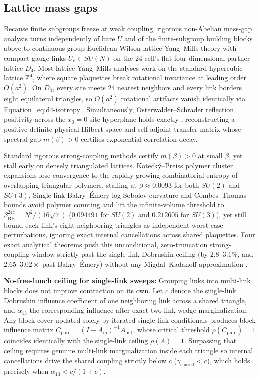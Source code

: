\subsection{Lattice mass gaps}

Because finite subgroups freeze at weak coupling, rigorous non-Abelian mass-gap analysis turns independently of bare $U$
and of the finite-subgroup building blocks above to continuous-group Euclidean Wilson lattice Yang--Mills theory
\cite{wilson1974} with compact gauge links $U_e \in SU(N)$ on the 24-cell's flat four-dimensional partner lattice $D_4$.
Most lattice Yang--Mills analyses work on the standard hypercubic lattice $\mathbb{Z}^4$, where square plaquettes break
rotational invariance at leading order $O(a^2)$. On $D_4$, every site meets 24 nearest neighbors and every link borders
eight equilateral triangles, so $O(a^2)$ rotational artifacts vanish identically via Equation~\eqref{eq:d4-isotropy}.
Simultaneously, Osterwalder--Schrader reflection positivity across the $x_0 = 0$ site hyperplane holds exactly
\cite{celmaster1982, osterwalder1978, seiler1982}, reconstructing a positive-definite physical Hilbert space and
self-adjoint transfer matrix whose spectral gap $m(\beta) > 0$ certifies exponential correlation decay.

Standard rigorous strong-coupling methods certify $m(\beta) > 0$ at small $\beta$, yet stall early on densely
triangulated lattices. Koteck\'y--Preiss polymer cluster expansions \cite{kotecky1986} lose convergence to the rapidly
growing combinatorial entropy of overlapping triangular polymers, stalling at $\beta \approx 0.0093$ for both $SU(2)$
and $SU(3)$. Single-link Bakry--\'Emery log-Sobolev curvature and Combes--Thomas bounds \cite{bakry1985, combes1973}
avoid polymer counting and lift the infinite-volume threshold to $\beta_{\mathrm{BE}}^{24c} = N^2 / (16\sqrt{7})$
($0.094491$ for $SU(2)$ and $0.212605$ for $SU(3)$), yet still bound each link's eight neighboring triangles as
independent worst-case perturbations, ignoring exact internal cancellations across shared plaquettes. Four exact
analytical theorems push this unconditional, zero-truncation strong-coupling window strictly past the single-link
Dobrushin ceiling (by $2.8\text{--}3.1\%$, and $2.65\text{--}3.02\times$ past Bakry--\'Emery) without any
Migdal--Kadanoff approximation \cite{dobrushin1970, dobrushin1985, holley1987, chen1997}.

\textbf{No-free-lunch ceiling for single-link sweeps:} Grouping links into multi-link blocks does not improve
contraction on its own. Let $c$ denote the single-link Dobrushin influence coefficient of one neighboring link across a
shared triangle, and $\alpha_{13}$ the corresponding influence after exact two-link wedge marginalization. Any block
cover updated solely by iterated single-link conditionals produces block influence matrix
$C_{\mathrm{pure}} = (I - A_{\mathrm{in}})^{-1} A_{\mathrm{out}}$, whose critical threshold $\rho(C_{\mathrm{pure}}) = 1$
coincides identically with the single-link ceiling $\rho(A) = 1$. Surpassing that ceiling requires genuine multi-link
marginalization inside each triangle so internal cancellations drive the shared coupling strictly below $c$
($\gamma_{\mathrm{shared}} < c$), which holds precisely when $\alpha_{13} < c / (1 + c)$.

